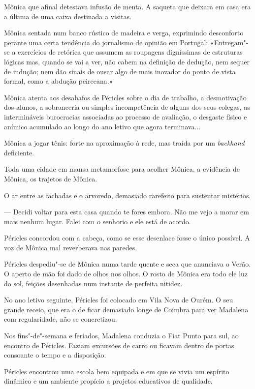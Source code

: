 Mônica que afinal detestava infusão de menta. A saqueta que deixara em
casa era a última de uma caixa destinada a visitas.

Mônica sentada num banco rústico de madeira e verga, exprimindo
desconforto perante uma certa tendência do jornalismo de opinião em
Portugal: «Entregam"-se a exercícios de retórica que assumem as roupagens
digníssimas de estruturas lógicas mas, quando se vai a ver, não cabem na
definição de dedução, nem sequer de indução; nem dão sinais de ousar
algo de mais inovador do ponto de vista formal, como a abdução
peirceana.»

Mônica atenta aos desabafos de Péricles sobre o dia de trabalho, a
desmotivação dos alunos, a sobranceria ou simples incompetência de
alguns dos seus colegas, as intermináveis burocracias associadas ao
processo de avaliação, o desgaste físico e anímico acumulado ao longo do
ano letivo que agora terminava...

Mônica a jogar tênis: forte na aproximação à rede, mas
traída por um \emph{backhand }deficiente.

Toda uma cidade em mansa metamorfose para acolher Mônica, a evidência de
Mônica, os trajetos de Mônica.

O ar entre as fachadas e o arvoredo, demasiado rarefeito para sustentar
mistérios.

--- Decidi voltar para esta casa quando te fores embora. Não me vejo a
morar em mais nenhum lugar. Falei com o senhorio e ele está de acordo.

Péricles concordou com a cabeça, como se esse desenlace fosse o único
possível. A voz de Mônica mal reverberava nas paredes.

Péricles despediu"-se de Mônica numa tarde quente e seca que anunciava o
Verão. O aperto de mão foi dado de olhos nos olhos. O rosto de Mônica
era todo ele luz do sol, feições desenhadas num instante de perfeita
nitidez.

No ano letivo seguinte, Péricles foi colocado em Vila Nova de Ourém. O
seu grande receio, que era o de ficar demasiado longe de Coimbra para
ver Madalena com regularidade, não se concretizou.

Nos fins"-de"-semana e feriados, Madalena conduzia o Fiat Punto para sul,
ao encontro de Péricles. Faziam excursões de carro ou ficavam dentro de
portas consoante o tempo e a disposição.

Péricles encontrou uma escola bem equipada e em que se vivia um espírito
dinâmico e um ambiente propício a projetos educativos de qualidade.

